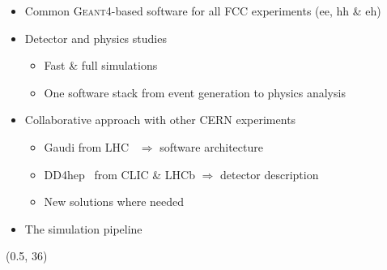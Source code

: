 \documentclass[final,xcolor={dvipsnames,svgnames,x11names,table}]{beamer}
\begin{document}
\begin{frame}
\begin{textblock}{38}
\begin{tcolorbox}[title=FCCSW: simulation software for FCC]
  \vspace{0.5cm}
  \begin{itemize}
    \item Common \textsc{Geant4}-based software for all FCC experiments (ee, hh \& eh)~\cite{FCCSW} \vspace{0.5cm}
    \item Detector and physics studies \vspace{0.5cm}
      \begin{itemize}
        \item Fast \& full simulations
        \item One software stack from event generation to physics analysis \vspace{0.5cm}
      \end{itemize}
    \item Collaborative approach with other CERN experiments \vspace{0.5cm}
      \begin{itemize}
        \item Gaudi from LHC~\cite{Gaudi} $\Rightarrow$ software architecture
        \item DD4hep~\cite{DD4hep} from CLIC \& LHCb $\Rightarrow$ detector description
        \item New solutions where needed
      \end{itemize}
    \item The simulation pipeline
  \end{itemize}

  \vspace{0.5cm}

  \centering
     \vspace{0.5cm}
  \end{tcolorbox}
\end{textblock}

\begin{textblock}{83}(0.5, 36)
  \begin{tcolorbox}[title=The IDEA detector concept for FCC-ee]


\end{tcolorbox}
\end{textblock}
\end{frame}
\end{document}
